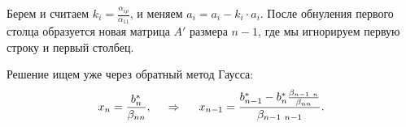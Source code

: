Берем и считаем $k_i = \frac{\alpha_{i \rho}}{\alpha_{11}}$, и меняем $a_i = a_i - k_i \cdot a_i$.
После обнуления первого столца образуется новая матрица $A'$ размера $n-1$, где мы игнорируем первую строку и первый столбец.


Решение ищем уже через обратный метод Гаусса:
\begin{equation*}
    x_n = \frac{b_n^*}{\beta_{nn}},
    \hspace{0.5cm} \Rightarrow \hspace{0.5cm}
    x_{n-1} = \frac{b_{n-1}^* - b_n^* \tfrac{\beta_{n-1 \ n}}{\beta_{nn}}}{\beta_{n-1 \ n-1}}.
\end{equation*}
 


















